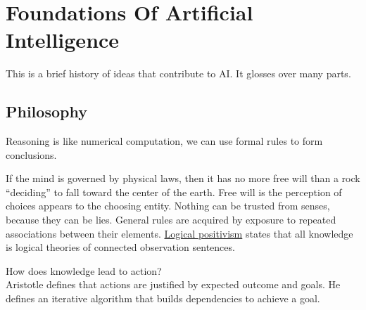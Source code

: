 
\section{Foundations Of Artificial Intelligence} %
\label{sec:foundations_of_artificial_intelligence}
This is a brief history of ideas that contribute to AI.
It glosses over many parts.

\subsection{Philosophy} %
\label{subsec:philosophy}
Reasoning is like numerical computation, we can use formal rules to form
conclusions.

If the mind is governed by physical laws, then it has no more free will than a
rock ``deciding'' to fall toward the center of the earth.
Free will is the perception of choices appears to the choosing entity.
Nothing can be trusted from senses, because they can be lies.
General rules are acquired by exposure to repeated associations between their elements.
\uline{Logical positivism} states that all knowledge is logical theories of
connected observation sentences.

How does knowledge lead to action? \\
Aristotle defines that actions are justified by expected outcome and goals.
He defines an iterative algorithm that builds dependencies to achieve a goal.


